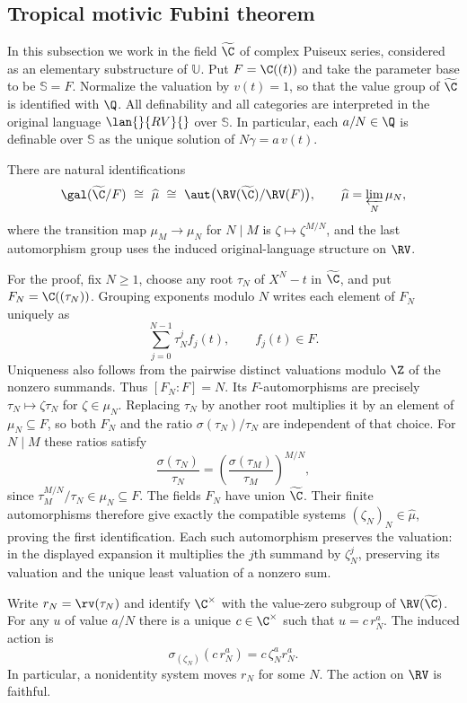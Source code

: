 \subsection{Tropical motivic Fubini theorem}\label{jp:fubini}
In this subsection we work in the field $\widetilde{\C}$ of complex
Puiseux series, considered as an elementary substructure of
$\mathbb U$. Put $F=\C((t))$ and take the parameter base to be
$\mathbb S=F$. Normalize the valuation by $v(t)=1$, so that the
value group of $\widetilde{\C}$ is identified with $\Q$.
All definability and all categories are interpreted in the original
language $\lan{}{RV}{}$ over $\mathbb S$. In particular, each
$a/N\in\Q$ is definable over $\mathbb S$ as the unique solution of
$N\gamma=a\,v(t)$.

\begin{rem}\label{puiseux:kummer:action}
There are natural identifications
\[
 \gal(\widetilde{\C}/F)\ \cong\ \widehat{\mu}
 \ \cong\ \aut\bigl(\RV(\widetilde{\C})/\RV(F)\bigr),
 \qquad
 \widehat{\mu}=\varprojlim_N\mu_N,
\]
where the transition map $\mu_M\to\mu_N$ for $N\mid M$
is $\zeta\mapsto\zeta^{M/N}$, and the last automorphism group
uses the induced original-language structure on $\RV$.

For the proof, fix $N\geq1$, choose any root $\tau_N$ of
$X^N-t$ in $\widetilde{\C}$, and put
$F_N=\C((\tau_N))$. Grouping exponents modulo $N$ writes each
element of $F_N$ uniquely as
\[
 \sum_{j=0}^{N-1}\tau_N^j f_j(t),\qquad f_j(t)\in F.
\]
Uniqueness also follows from the pairwise distinct valuations
modulo $\Z$ of the nonzero summands. Thus $[F_N:F]=N$.
Its $F$-automorphisms are precisely
$\tau_N\mapsto\zeta\tau_N$ for $\zeta\in\mu_N$.
Replacing $\tau_N$ by another root multiplies it by an element
of $\mu_N\subseteq F$, so both $F_N$ and the ratio
$\sigma(\tau_N)/\tau_N$ are independent of that choice.
For $N\mid M$ these ratios satisfy
\[
 \frac{\sigma(\tau_N)}{\tau_N}
 =
 \left(\frac{\sigma(\tau_M)}{\tau_M}\right)^{M/N},
\]
since $\tau_M^{M/N}/\tau_N\in\mu_N\subseteq F$.
The fields $F_N$ have union $\widetilde{\C}$.
Their finite automorphisms therefore give exactly the compatible
systems $(\zeta_N)_N\in\widehat{\mu}$, proving the first
identification. Each such automorphism preserves the valuation:
in the displayed expansion it multiplies the $j$th summand by
$\zeta_N^j$, preserving its valuation and the unique least
valuation of a nonzero sum.

Write $r_N=\rv(\tau_N)$ and identify $\C^\times$ with the
value-zero subgroup of $\RV(\widetilde{\C})$.
For any $u$ of value $a/N$ there is a unique $c\in\C^\times$
such that $u=c\,r_N^a$. The induced action is
\[
 \sigma_{(\zeta_N)}(c\,r_N^a)
   =c\,\zeta_N^a r_N^a .
\]
In particular, a nonidentity system moves $r_N$ for some $N$.
The action on $\RV$ is faithful.


\end{rem}
